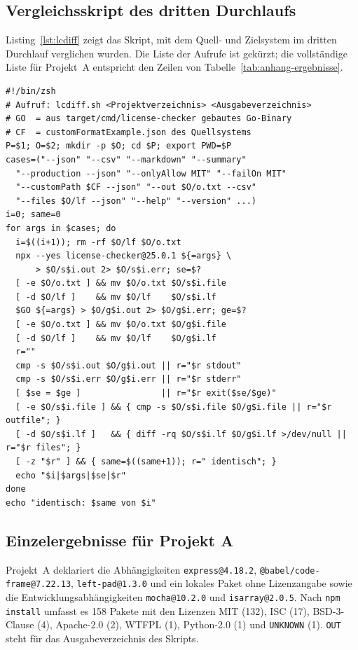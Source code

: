 \subsection{Vergleichsskript des dritten Durchlaufs} \label{anhang:skript}

Listing~\ref{lst:lcdiff} zeigt das Skript, mit dem Quell- und Zielsystem im dritten Durchlauf verglichen wurden. Die Liste der Aufrufe ist gekürzt; die vollständige Liste für Projekt~A entspricht den Zeilen von Tabelle~\ref{tab:anhang-ergebnisse}.

\begin{lstlisting}[style=codestyle, caption={Skript für den byteweisen I/O-Vergleich (gekürzt)}, label=lst:lcdiff, breaklines=true, basicstyle=\ttfamily\footnotesize]
#!/bin/zsh
# Aufruf: lcdiff.sh <Projektverzeichnis> <Ausgabeverzeichnis>
# GO  = aus target/cmd/license-checker gebautes Go-Binary
# CF  = customFormatExample.json des Quellsystems
P=$1; O=$2; mkdir -p $O; cd $P; export PWD=$P
cases=("--json" "--csv" "--markdown" "--summary"
  "--production --json" "--onlyAllow MIT" "--failOn MIT"
  "--customPath $CF --json" "--out $O/o.txt --csv"
  "--files $O/lf --json" "--help" "--version" ...)
i=0; same=0
for args in $cases; do
  i=$((i+1)); rm -rf $O/lf $O/o.txt
  npx --yes license-checker@25.0.1 ${=args} \
      > $O/s$i.out 2> $O/s$i.err; se=$?
  [ -e $O/o.txt ] && mv $O/o.txt $O/s$i.file
  [ -d $O/lf ]    && mv $O/lf    $O/s$i.lf
  $GO ${=args} > $O/g$i.out 2> $O/g$i.err; ge=$?
  [ -e $O/o.txt ] && mv $O/o.txt $O/g$i.file
  [ -d $O/lf ]    && mv $O/lf    $O/g$i.lf
  r=""
  cmp -s $O/s$i.out $O/g$i.out || r="$r stdout"
  cmp -s $O/s$i.err $O/g$i.err || r="$r stderr"
  [ $se = $ge ]                || r="$r exit($se/$ge)"
  [ -e $O/s$i.file ] && { cmp -s $O/s$i.file $O/g$i.file || r="$r outfile"; }
  [ -d $O/s$i.lf ]   && { diff -rq $O/s$i.lf $O/g$i.lf >/dev/null || r="$r files"; }
  [ -z "$r" ] && { same=$((same+1)); r=" identisch"; }
  echo "$i|$args|$se|$r"
done
echo "identisch: $same von $i"
\end{lstlisting}

\subsection{Einzelergebnisse für Projekt A} \label{anhang:ergebnisse}

Projekt~A deklariert die Abhängigkeiten \texttt{express@4.18.2}, \texttt{@babel/code-frame@7.22.13}, \texttt{left-pad@1.3.0} und ein lokales Paket ohne Lizenzangabe sowie die Entwicklungsabhängigkeiten \texttt{mocha@10.2.0} und \texttt{isarray@2.0.5}. Nach \texttt{npm install} umfasst es 158 Pakete mit den Lizenzen MIT (132), ISC (17), BSD-3-Clause (4), Apache-2.0 (2), WTFPL (1), Python-2.0 (1) und \texttt{UNKNOWN} (1). \texttt{OUT} steht für das Ausgabeverzeichnis des Skripts.


